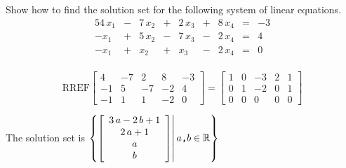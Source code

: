 
\begin{exerciseStatement}


Show how to find the solution set for the following system of linear equations. 
\begin{alignat*}{5} 4 \, x_{1} &-& 7 \, x_{2} &+& 2 \, x_{3} &+& 8 \, x_{4} &=& -3 \\-x_{1} &+& 5 \, x_{2} &-& 7 \, x_{3} &-& 2 \, x_{4} &=& 4 \\-x_{1} &+& x_{2} &+& x_{3} &-& 2 \, x_{4} &=& 0 \\ \end{alignat*}
            


\end{exerciseStatement}
    
\begin{exerciseAnswer} 
\[\mathrm{RREF} \left[\begin{array}{cccc|c}
4 & -7 & 2 & 8 & -3 \\
-1 & 5 & -7 & -2 & 4 \\
-1 & 1 & 1 & -2 & 0
\end{array}\right]  =  \left[\begin{array}{cccc|c}
1 & 0 & -3 & 2 & 1 \\
0 & 1 & -2 & 0 & 1 \\
0 & 0 & 0 & 0 & 0
\end{array}\right] \]

The solution set is \( \left\{ \left[\begin{array}{c}
3 \, a - 2 \, b + 1 \\
2 \, a + 1 \\
a \\
b
\end{array}\right] \middle|\,a\text{\texttt{,}}b\in\mathbb{R}\right\} \)


\end{exerciseAnswer}
    
